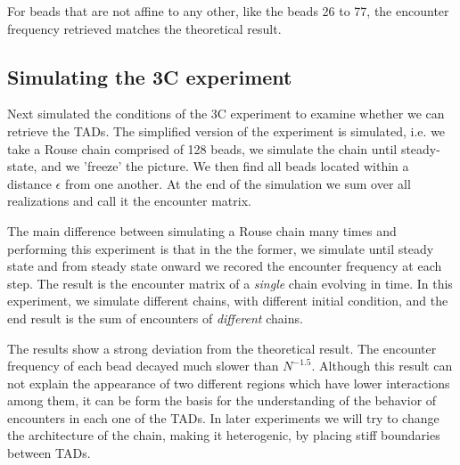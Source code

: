 \documentclass[12pt]{book}
\begin{document}
For beads that are not affine to any other, like the beads 26 to 77, the encounter frequency retrieved matches the theoretical result. 

\subsection{Simulating the 3C experiment}
Next simulated  the conditions of the 3C experiment to examine whether we can retrieve the TADs. The simplified version of the experiment is simulated, i.e. we  take a Rouse chain comprised of 128 beads, we simulate the chain until steady-state, and we 'freeze' the picture. We then find all beads located within a distance $\epsilon$ from one another. At the end of the simulation we sum over all realizations and call it the encounter matrix. 

The main difference between simulating a Rouse chain many times and performing this experiment is that in the the former, we simulate until steady state and from steady state onward we recored the encounter frequency at each step. The result is the encounter matrix of a \textit{single} chain evolving in time. In this experiment, we simulate different chains, with different initial condition, and the end result is the sum of encounters of \textit{different} chains. 

The results show a strong deviation from the theoretical result. The encounter frequency of each bead decayed much slower than $N^{-1.5}$. Although this result can not explain the appearance of two different regions which have lower interactions among them, it can be form the basis for the understanding of the behavior of encounters in each one of the TADs. In later experiments we will try to change the architecture of the chain, making it heterogenic, by placing stiff boundaries between TADs. 
\end{document}
